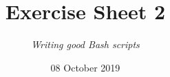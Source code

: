 




\title{{\vspace{-12mm}\huge\textbf{Exercise Sheet 2}}}
\author{\textit{Writing good Bash scripts}}
\date{{\small 08 October 2019}}


    \maketitle
    \bigskip
    
    \bigskip
    
    \bigskip
    
    \newpage
    
    \newpage
    
    \bigskip
    
